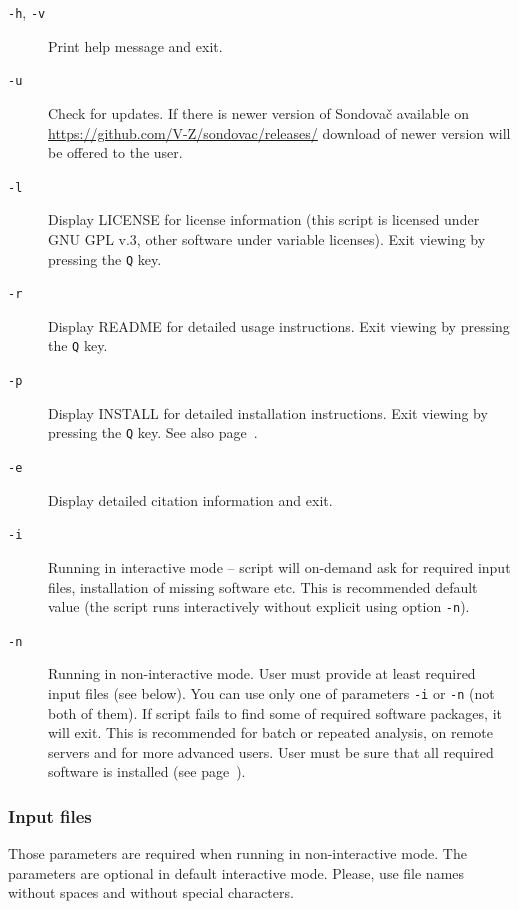 \documentclass[a4paper, 11pt, twoside]{article}
\begin{document}
\begin{description}
  \item[\texttt{-h}, \texttt{-v}] Print help message and exit.
  \item[\texttt{-u}] Check for updates. If there is newer version of Sondovač available on \href{https://github.com/V-Z/sondovac/releases/}{https://github.com/V-Z/sondovac/releases/} download of newer version will be offered to the user.
  \item[\texttt{-l}] Display LICENSE for license information (this script is licensed under GNU GPL v.3, other software under variable licenses). Exit viewing by pressing the \texttt{Q} key.
  \item[\texttt{-r}] Display README for detailed usage instructions. Exit viewing by pressing the \texttt{Q} key.
  \item[\texttt{-p}] Display INSTALL for detailed installation instructions. Exit viewing by pressing the \texttt{Q} key. See also page~\pageref{install}.
  \item[\texttt{-e}] Display detailed citation information and exit.
  \item[\texttt{-i}] Running in interactive mode -- script will on-demand ask for required input files, installation of missing software etc. This is recommended default value (the script runs interactively without explicit using option \texttt{-n}).
  \item[\texttt{-n}] Running in non-interactive mode. User must provide at least required input files (see below). You can use only one of parameters \texttt{-i} or \texttt{-n} (not both of them). If script fails to find some of required software packages, it will exit. This is recommended for batch or repeated analysis, on remote servers and for more advanced users. User must be sure that all required software is installed (see page~\pageref{install}).
\end{description}

\subsubsection{Input files}

Those parameters are required when running in non-interactive mode. The parameters are optional in default interactive mode. Please, use file names without spaces and without special characters.
\end{document}
